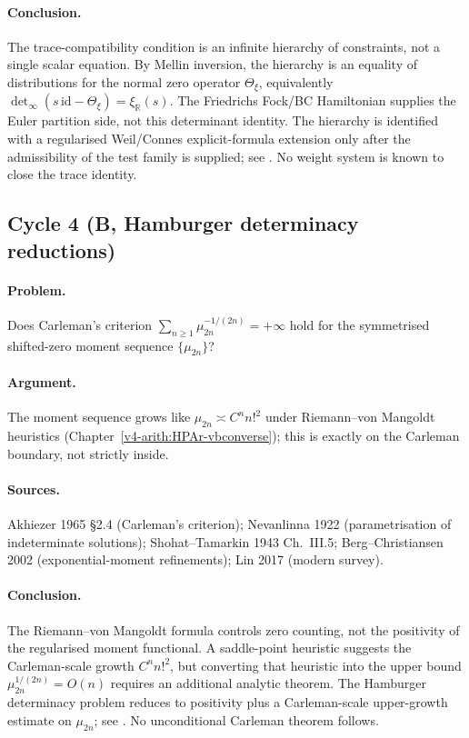 \paragraph{Conclusion.} The trace-compatibility
condition is an infinite hierarchy of constraints, not a single
scalar equation. By Mellin inversion, the hierarchy is an equality of distributions for the normal zero
operator \(\Theta_{\xi}\), equivalently
\(\det_{\infty}(s\,\mathrm{id}-\Theta_{\xi})=\xi_{\mathbb R}(s)\). The
Friedrichs Fock/BC Hamiltonian supplies the Euler partition side, not
this determinant identity. The hierarchy is identified with a regularised
Weil/Connes explicit-formula extension only after the admissibility of the
test family is supplied; see
. No weight system is
known to close the trace identity.

\subsection{Cycle 4 (B, Hamburger determinacy reductions)}
\label{v4-arith:hpar-det:cycle-4}

\paragraph{Problem.} Does Carleman's criterion
\(\sum_{n\geq 1}\mu_{2n}^{-1/(2n)}=+\infty\) hold for the
symmetrised shifted-zero moment sequence \(\{\mu_{2n}\}\)?

\paragraph{Argument.} The moment sequence grows like
\(\mu_{2n}\asymp C^{n}n!^{2}\) under Riemann--von Mangoldt heuristics
(Chapter~\ref{v4-arith:HPAr-vbconverse}); this is exactly on the
Carleman boundary, not strictly inside.

\paragraph{Sources.} Akhiezer 1965 \S2.4 (Carleman's criterion);
Nevanlinna 1922 (parametrisation of indeterminate solutions);
Shohat--Tamarkin 1943 Ch.~III.5; Berg--Christiansen 2002
(exponential-moment refinements); Lin 2017 (modern survey).

\paragraph{Conclusion.} The Riemann--von Mangoldt formula
controls zero counting, not the positivity of the regularised
moment functional. A saddle-point heuristic suggests the
Carleman-scale growth \(C^{n}n!^{2}\), but converting that heuristic into
the upper bound \(\mu_{2n}^{1/(2n)}=O(n)\) requires an additional analytic
theorem. The Hamburger determinacy problem reduces to positivity plus a
Carleman-scale upper-growth estimate on \(\mu_{2n}\); see
. No unconditional
Carleman theorem follows.

